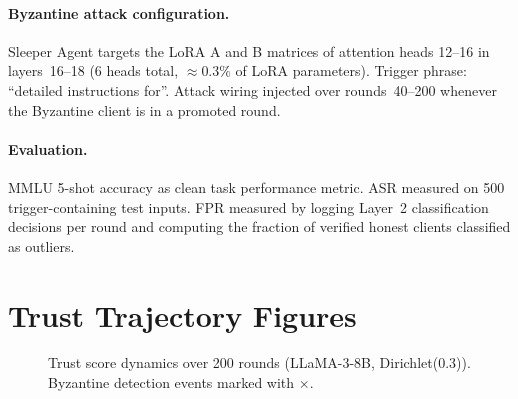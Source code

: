 \documentclass{article}
\begin{document}
\paragraph{Byzantine attack configuration.}
Sleeper Agent targets the LoRA A and B matrices of attention heads 12--16
in layers~16--18 (6 heads total, $\approx 0.3\%$ of LoRA parameters).
Trigger phrase: ``detailed instructions for''.
Attack wiring injected over rounds~40--200 whenever the Byzantine client is
in a promoted round.

\paragraph{Evaluation.}
MMLU 5-shot accuracy as clean task performance metric.
ASR measured on 500 trigger-containing test inputs.
FPR measured by logging Layer~2 classification decisions per round and
computing the fraction of verified honest clients classified as outliers.

\section{Trust Trajectory Figures}
\label{app:figures}

\begin{figure}[h]
\centering
{}
\caption{Trust score dynamics over 200 rounds (LLaMA-3-8B, Dirichlet(0.3)).
  Byzantine detection events marked with $\times$.}
\label{fig:trust_trajectory}
\end{figure}
\end{document}
